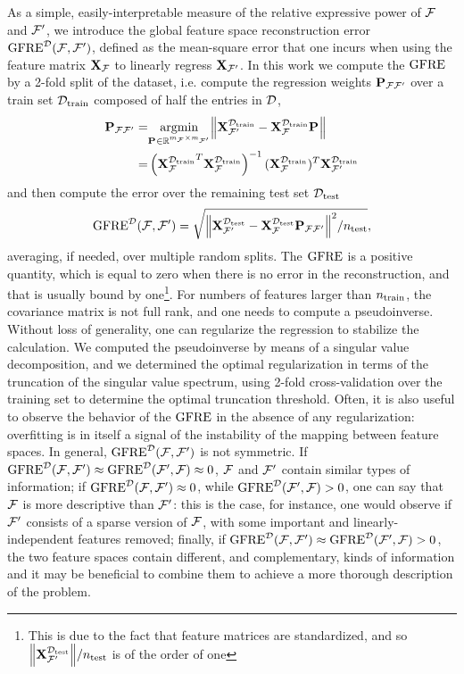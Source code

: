 As a simple, easily-interpretable measure of the relative expressive power of $\mathcal{F}$ and $\mathcal{F}^{\prime}$, we introduce the global feature space reconstruction error $\operatorname{GFRE}^{\mathcal{D}}(\mathcal{F},\mathcal{F}^{\prime})$, defined as the mean-square error that one incurs when using the feature matrix $\mathbf{X}_{\mathcal{F}}$ to linearly regress $\mathbf{X}_{\mathcal{F}^{\prime}}$. 
In this work we compute the $\operatorname{GFRE}$ by a 2-fold split of the dataset, i.e. compute the regression weights $\mathbf{P}_{{\mathcal{F}}{\mathcal{F}^{\prime}}}$ over a train set $\mathcal{D}_{\mathrm{train}}$ composed of half the entries in $\mathcal{D}$,
\begin{equation}
\begin{split}
\mathbf{P}_{{\mathcal{F}}{\mathcal{F}^{\prime}}}= &
\underset{\mathbf{P}_{{}{}}\in\mathbb{R}^{m_{\mathcal{F}}\times m_{\mathcal{F}^{\prime}}}}{\operatorname{argmin}}
\norm{\mathbf{X}^{\mathcal{D}_{\mathrm{train}}}_{\mathcal{F}^{\prime}} - \mathbf{X}^{\mathcal{D}_{\mathrm{train}}}_{\mathcal{F}} \mathbf{P}_{{}{}}  }\\
=&\left({\mathbf{X}_{\mathcal{F}}^{\mathcal{D}_{\mathrm{train}}}}^T \mathbf{X}_{\mathcal{F}}^{\mathcal{D}_{\mathrm{train}}}\right)^{-1}
(\mathbf{X}_{\mathcal{F}}^{\mathcal{D}_{\mathrm{train}}})^T\mathbf{X}_{\mathcal{F}^{\prime}}^{\mathcal{D}_{\mathrm{train}}}
\end{split}\label{eq:proj-ff1}
\end{equation}
and then compute the error over the remaining test set $\mathcal{D}_{\mathrm{test}}$
\begin{equation}
\operatorname{GFRE}^{\mathcal{D}}(\mathcal{F},\mathcal{F}^{\prime}) = \sqrt{{\norm{\mathbf{X}^{\mathcal{D}_{\mathrm{test}}}_{\mathcal{F}^{\prime}} - \mathbf{X}^{\mathcal{D}_{\mathrm{test}}}_{\mathcal{F}} \mathbf{P}_{{\mathcal{F}}{\mathcal{F}^{\prime}}}  }^2}/n_{\mathrm{test}}},
\label{eq:GFRE}
\end{equation}
averaging, if needed, over multiple random splits.  The $\operatorname{GFRE}$ is a positive quantity, which is equal to zero when there is no error in the reconstruction, and that is usually bound by one\footnote{This is due to the fact that feature matrices are standardized, and so $\norm{\mathbf{X}^{\mathcal{D}_{\mathrm{test}}}_{\mathcal{F}^{\prime}}}/n_{\mathrm{test}} $ is of the order of one}.
For numbers of features larger than $n_{\mathrm{train}}$, the covariance matrix is not full rank, and one needs to compute a pseudoinverse. Without loss of generality, one can regularize the regression to stabilize the calculation. We computed the pseudoinverse by means of a singular value decomposition, and we determined the optimal regularization in terms of the truncation of the singular value spectrum, using 2-fold cross-validation over the training set to determine the optimal truncation threshold. Often, it is also useful to observe the behavior of the $\operatorname{GFRE}$ in the absence of any regularization: overfitting is in itself a signal of the instability of the mapping between feature spaces.
In general, $\operatorname{GFRE}^{\mathcal{D}}(\mathcal{F},\mathcal{F}^{\prime})$ is not symmetric. If $\operatorname{GFRE}^{\mathcal{D}}(\mathcal{F},\mathcal{F}^{\prime})\approx\operatorname{GFRE}^{\mathcal{D}}(\mathcal{F}^{\prime},\mathcal{F})\approx 0$, $\mathcal{F}$ and $\mathcal{F}^{\prime}$ contain similar types of information; if $\operatorname{GFRE}^{\mathcal{D}}(\mathcal{F},\mathcal{F}^{\prime})\approx 0$, while $\operatorname{GFRE}^{\mathcal{D}}(\mathcal{F}^{\prime},\mathcal{F})>0$, one can say that $\mathcal{F}$ is more descriptive than $\mathcal{F}^{\prime}$: this is the case, for instance, one would observe if $\mathcal{F}^{\prime}$ consists of a sparse version of $\mathcal{F}$, with some important and linearly-independent features removed; finally, if  $\operatorname{GFRE}^{\mathcal{D}}(\mathcal{F},\mathcal{F}^{\prime})\approx\operatorname{GFRE}^{\mathcal{D}}(\mathcal{F}^{\prime},\mathcal{F})>0$, the two feature spaces contain different, and complementary, kinds of information and it may be beneficial to combine them to achieve a more thorough description of the problem.

